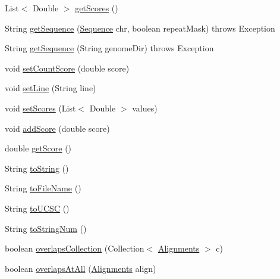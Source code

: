 \begin{DoxyCompactItemize}
List$<$ Double $>$ \hyperlink{classbroad_1_1pda_1_1datastructures_1_1_alignments_af6439db4165fd6e08b0c97e5ed96ec5f}{get\+Scores} ()
\item 
String \hyperlink{classbroad_1_1pda_1_1datastructures_1_1_alignments_a63b9f93fe9fd447fe2b815f3d27970b9}{get\+Sequence} (\hyperlink{classbroad_1_1core_1_1sequence_1_1_sequence}{Sequence} chr, boolean repeat\+Mask)  throws Exception 
\item 
String \hyperlink{classbroad_1_1pda_1_1datastructures_1_1_alignments_af85738a8a7dc405405d467a343ff307b}{get\+Sequence} (String genome\+Dir)  throws Exception 
\item 
void \hyperlink{classbroad_1_1pda_1_1datastructures_1_1_alignments_a5df291246f8050ba25e2bb7efc7f6b28}{set\+Count\+Score} (double score)
\item 
void \hyperlink{classbroad_1_1pda_1_1datastructures_1_1_alignments_a6d94c020e29525e81a71479ff5459ba8}{set\+Line} (String line)
\item 
void \hyperlink{classbroad_1_1pda_1_1datastructures_1_1_alignments_a513c21f833532890968ad1737a4ca89f}{set\+Scores} (List$<$ Double $>$ values)
\item 
void \hyperlink{classbroad_1_1pda_1_1datastructures_1_1_alignments_a4bcae75b31b4a9b98e7152d7b184f0f1}{add\+Score} (double score)
\item 
double \hyperlink{classbroad_1_1pda_1_1datastructures_1_1_alignments_ad035b618294c2b18a553049446b814f5}{get\+Score} ()
\item 
String \hyperlink{classbroad_1_1pda_1_1datastructures_1_1_alignments_a9e4d11765db80c31771e4dc66cbe358d}{to\+String} ()
\item 
String \hyperlink{classbroad_1_1pda_1_1datastructures_1_1_alignments_ae4a5f213a35b8a578707ad286280f23f}{to\+File\+Name} ()
\item 
String \hyperlink{classbroad_1_1pda_1_1datastructures_1_1_alignments_afc4c11e6eb0231559d46afc7a61fa6da}{to\+U\+C\+S\+C} ()
\item 
String \hyperlink{classbroad_1_1pda_1_1datastructures_1_1_alignments_a1d6d0f235ad28717c61b53bf50c34e99}{to\+String\+Num} ()
\item 
boolean \hyperlink{classbroad_1_1pda_1_1datastructures_1_1_alignments_a000660e9742f30bad37f072dcac3fdb4}{overlaps\+Collection} (Collection$<$ \hyperlink{classbroad_1_1pda_1_1datastructures_1_1_alignments}{Alignments} $>$ c)
\item 
boolean \hyperlink{classbroad_1_1pda_1_1datastructures_1_1_alignments_a30cfff00d9cf602b57825f9b98cbcbc5}{overlaps\+At\+All} (\hyperlink{classbroad_1_1pda_1_1datastructures_1_1_alignments}{Alignments} align)

\end{DoxyCompactItemize}
